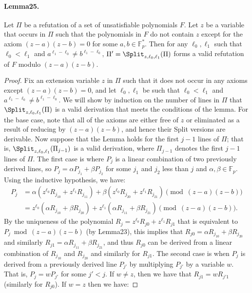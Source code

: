 \paragraph{Lemma25.} Let $\Pi$ be a refutation of a set of unsatisfiable polynomials $F$. Let $z$ be a variable that occurs in $\Pi$ such that the polynomials in $F$ do not contain $z$ except for the axiom $(z-a)(z-b)=0$ for some $a,b\in\mathbb F_p^*$. Then for any $\ell_0,\ell_1$ such that $\ell_0<\ell_1$ and $a^{\ell_1-\ell_0}\neq b^{\ell_1-\ell_0}$, $\Pi'=\Split_{z,\ell_0,\ell_1}(\Pi)$ forms a valid refutation of $F$ modulo $(z-a)(z-b)$.
\begin{proof}
Fix an extension variable $z$ in $\Pi$ such that it does not occur in any axioms except $(z-a)(z-b)=0$, and let $\ell_0,\ell_1$ be such that $\ell_0<\ell_1$ and $a^{\ell_1-\ell_0}\neq b^{\ell_1-\ell_0}$. We will show by induction on the number of lines in $\Pi$ that $\Split_{z,\ell_0,\ell_1}(\Pi)$ is a valid derivation that meets the conditions of the lemma. For the base case, note that all of the axioms are either free of $z$ or eliminated as a result of reducing by $(z-a)(z-b)$, and hence their Split versions are derivable. Now suppose that the Lemma holds for the first $j-1$ lines of $\Pi$; that is, $\Split_{z,\ell_0,\ell_1}(\Pi_{j-1})$ is a valid derivation, where $\Pi_{j-1}$ denotes the first $j-1$ lines of $\Pi$.
The first case is where $P_j$ is a linear combination of two previously derived lines, so $P_j=\alpha P_{j_1}+\beta P_{j_2}$ for some $j_1$ and $j_2$ less than $j$ and $\alpha,\beta\in\mathbb F_p$. Using the inductive hypothesis, we have:
\begin{align*}
P_j&=\alpha(z^{\ell_0}R_{j_10}+z^{\ell_1}R_{j_11})+\beta(z^{\ell_0}R_{j_20}+z^{\ell_1}R_{j_21})\pmod{(z-a)(z-b)}\\
&=z^{\ell_0}(\alpha R_{j_10}+\beta R_{j_20})+z^{\ell_1}(\alpha R_{j_11}+\beta R_{j_21})\pmod{(z-a)(z-b)}.
\end{align*}
By the uniqueness of the polynomial $R_j=z^{\ell_0}R_{j0}+z^{\ell_1}R_{j1}$ that is equivalent to $P_j\bmod(z-a)(z-b)$ (by Lemma23), this implies that $R_{j0}=\alpha R_{j_10}+\beta R_{j_20}$ and similarly $R_{j1}=\alpha R_{j_11}+\beta R_{j_21}$, and thus $R_{j0}$ can be derived from a linear combination of $R_{j_10}$ and $R_{j_20}$ and similarly for $R_{j1}$.
The second case is when $P_j$ is derived from a previously derived line $P_{j'}$ by multiplying $P_{j'}$ by a variable $w$. That is, $P_j=wP_{j'}$ for some $j'<j$. If $w\neq z$, then we have that $R_{j1}=wR_{j'1}$ (similarly for $R_{j0}$). If $w=z$ then we have:

\end{proof}
